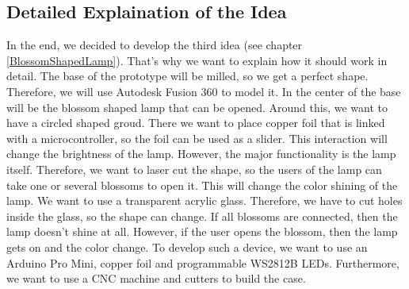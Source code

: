 \documentclass[00_doc.tex]{subfiles}
\begin{document}
    \subsection{Detailed Explaination of the Idea}
        \begin{flushleft}
            In the end, we decided to develop the third idea (see chapter \ref{BlossomShapedLamp}). That's why we want to explain 
            how it should work in detail. \newline
            The base of the prototype will be milled, so we get a perfect shape. Therefore, we will use Autodesk Fusion 360\cite{autodeskFusion360}
            to model it. In the center of the base will be the blossom shaped lamp that can be opened. Around this, we want to have a 
            circled shaped groud. There we want to place copper foil that is linked with a microcontroller, %
            so the foil can be used as a slider. This interaction will change the brightness of the lamp. \newline
            However, the major functionality is the lamp itself. Therefore, we want to laser cut the shape, so the users of the lamp can
            take one or several blossoms to open it. This will change the color shining of the lamp. We want to use a transparent acrylic glass.
            Therefore, we have to cut holes inside the glass, so the shape can change.  \newline
            If all blossoms are connected, then the lamp doesn't shine at all. However, if the user opens the blossom, then the lamp gets on
            and the color change. 
            \newline
            \newline
            To develop such a device, we want to use an Arduino Pro Mini, copper foil and programmable WS2812B LEDs.
            Furthermore, we want to use a CNC machine and cutters to build the case.
        \end{flushleft}
\end{document}
